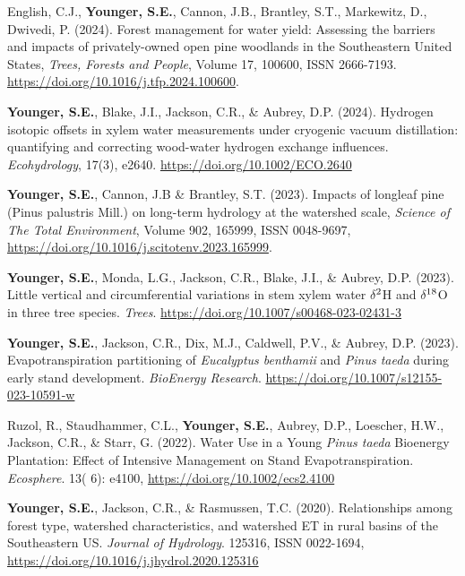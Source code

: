 \documentclass[10pt,letterpaper]{article}
\begin{document}
	\begin{hangparas}{.25in}{1}
		
		English, C.J., \textbf{Younger, S.E.}, Cannon, J.B., Brantley, S.T., Markewitz, D., Dwivedi, P. (2024). Forest management for water yield: Assessing the barriers and impacts of privately-owned open pine woodlands in the Southeastern United States, \textit{Trees, Forests and People}, Volume 17, 100600, ISSN 2666-7193. \url{https://doi.org/10.1016/j.tfp.2024.100600}.
		
		\textbf{Younger, S.E.}, Blake, J.I., Jackson, C.R., \& Aubrey, D.P. (2024). Hydrogen isotopic offsets in xylem water measurements under cryogenic vacuum distillation: quantifying and correcting wood-water hydrogen exchange influences. \textit{Ecohydrology}, 17(3), e2640. \url{https://doi.org/10.1002/ECO.2640}
		
		\textbf{Younger, S.E.}, Cannon, J.B \& Brantley, S.T. (2023). Impacts of longleaf pine (Pinus palustris Mill.) on long-term hydrology at the watershed scale, \textit{Science of The Total Environment}, Volume 902, 165999, ISSN 0048-9697, \url{https://doi.org/10.1016/j.scitotenv.2023.165999}.
		
		\textbf{Younger, S.E.}, Monda, L.G., Jackson, C.R., Blake, J.I., \& Aubrey, D.P. (2023). Little vertical and circumferential variations in stem xylem water $\delta$$\textsuperscript{2}$H and $\delta$$\textsuperscript{18}$O in three tree species. \textit{Trees}. \newline \url{https://doi.org/10.1007/s00468-023-02431-3}
		
		\textbf{Younger, S.E.}, Jackson, C.R., Dix, M.J., Caldwell, P.V., \& Aubrey, D.P. (2023). Evapotranspiration partitioning of \textit{Eucalyptus benthamii} and \textit{Pinus taeda} during early stand development. \textit{BioEnergy Research}. \url{https://doi.org/10.1007/s12155-023-10591-w}
		
		Ruzol, R., Staudhammer, C.L., \textbf{Younger, S.E.}, Aubrey, D.P., Loescher, H.W., Jackson, C.R., \& Starr, G. (2022). Water Use in a Young \textit{Pinus taeda} Bioenergy Plantation: Effect of Intensive Management on Stand Evapotranspiration. \textit{Ecosphere}. 13( 6): e4100, \url{https://doi.org/10.1002/ecs2.4100}
		
		\textbf{Younger, S.E.}, Jackson, C.R., \& Rasmussen, T.C. (2020). Relationships among forest type, watershed characteristics, and watershed ET in rural basins of the Southeastern US.
		\textit{Journal of Hydrology}. 125316, ISSN 0022-1694, \url{https://doi.org/10.1016/j.jhydrol.2020.125316}
		

\end{hangparas}
\end{document}
